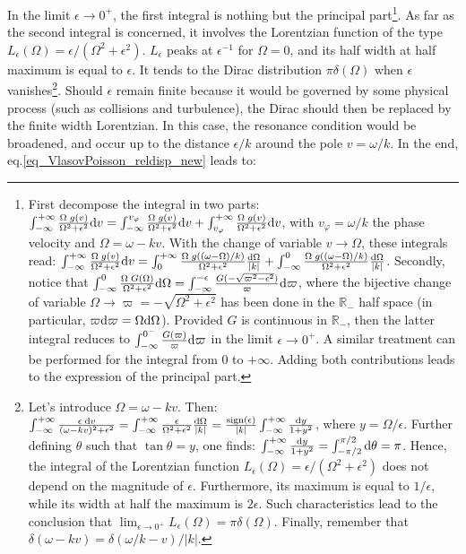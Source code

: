 \documentclass[11pt]{article}
\newcommand{\dd}{\textrm d}
\begin{document}
In the limit $\epsilon\to0^+$, the first integral is nothing but the principal part\footnote{First decompose the integral in two parts: $\int_{-\infty}^{+\infty}
\frac{\Omega\;g(v)}{\Omega^2+\epsilon^2} \dd v = \int_{-\infty}^{v_\varphi}
\frac{\Omega\;g(v)}{\Omega^2+\epsilon^2} \dd v + \int_{v_\varphi}^{+\infty}
\frac{\Omega\;g(v)}{\Omega^2+\epsilon^2} \dd v$, with $v_\varphi=\omega/k$ the phase velocity and $\Omega = \omega-kv$. With the change of variable $v\to\Omega$, these integrals read: $\int_{-\infty}^{+\infty}
\frac{\Omega\;g(v)}{\Omega^2+\epsilon^2} \dd v = \int_0^{+\infty} \frac{\Omega\;g((\omega-\Omega)/k)} {\Omega^2+\epsilon^2} \frac{\dd\Omega}{|k|} + \int_{-\infty}^0 \frac{\Omega\;g((\omega-\Omega)/k)} {\Omega^2+\epsilon^2} \frac{\dd\Omega}{|k|}$. Secondly, notice that $\int_{-\infty}^0 \frac{\Omega\;G(\Omega)} {\Omega^2+\epsilon^2} \dd\Omega = \int_{-\infty}^{-\epsilon} \frac{G(-\sqrt{\varpi^2-\epsilon^2})}{\varpi} \dd\varpi$, where the bijective change of variable $\Omega\to \varpi=-\sqrt{\Omega^2+\epsilon^2}$ has been done in the $\mathbb{R}_-$ half space (in particular, $\varpi\dd \varpi = \Omega\dd \Omega$). Provided $G$ is continuous in $\mathbb{R}_-$, then the latter integral reduces to $\int_{-\infty}^{0^-} \frac{G(\varpi)}{\varpi} \dd\varpi$ in the limit $\epsilon\to0^+$. A similar treatment can be performed for the integral from 0 to $+\infty$. Adding both contributions leads to the expression of the principal part.}. As far as the second integral is concerned, it involves the Lorentzian function of the type $L_\epsilon(\Omega) =\epsilon/ (\Omega^2+\epsilon^2)$. $L_\epsilon$ peaks at $\epsilon^{-1}$ for $\Omega=0$, and its half width at half maximum is equal to $\epsilon$. It tends to the Dirac distribution $\pi\delta(\Omega)$ when $\epsilon$ vanishes\footnote{Let's introduce $\Omega=\omega-kv$. Then: $\int_{-\infty}^{+\infty} \frac{\epsilon\; \dd v}{(\omega - kv)^2+\epsilon^2} = \int_{-\infty}^{+\infty} \frac{\epsilon}{\Omega^2+\epsilon^2} \frac{\dd\Omega}{|k|} = \frac{\textrm{sign}(\epsilon)}{|k|} \int_{-\infty}^{+\infty} \frac{\dd y}{1+y^2}$, where $y=\Omega/\epsilon$. Further defining $\theta$ such that $\tan\theta = y$, one finds: $\int_{-\infty}^{+\infty} \frac{\dd y}{1+y^2} = \int_{-\pi/2}^{\pi/2} \dd \theta = \pi$. Hence, the integral of the Lorentzian function $L_\epsilon(\Omega) =\epsilon/ (\Omega^2+\epsilon^2)$ does not depend on the magnitude of $\epsilon$. Furthermore, its maximum is equal to $1/\epsilon$, while its width at half the maximum is $2\epsilon$. Such characteristics lead to the conclusion that $\lim_{\epsilon\to0^+} L_\epsilon(\Omega) = \pi\delta(\Omega)$. Finally, remember that $\delta(\omega-kv) = \delta(\omega/k-v)/|k|$.}. Should $\epsilon$ remain finite because it would be governed by some physical process (such as collisions and turbulence), the Dirac should then be replaced by the finite width Lorentzian. In this case, the resonance condition would be broadened, and occur up to the distance $\epsilon/k$ around the pole $v=\omega/k$. In the end, eq.\eqref{eq_VlasovPoisson_reldisp_new} leads to:
\end{document}
